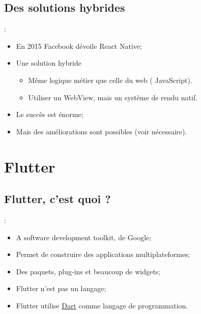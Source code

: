 \documentclass[10pt]{beamer}
\begin{document}
\subsection{Des solutions hybrides}
\begin{frame}[fragile,t]{\secname : \subsecname}
    \begin{itemize}
        \item En 2015 Facebook dévoile React Native;
        \item Une solution hybride
              \begin{itemize}
                  \item Même logique métier que celle du web ( JavaScript).
                  \item Utiliser un WebView, mais un système de rendu natif.
              \end{itemize}
        \item Le succès est énorme;
        \item Mais des améliorations sont possibles (voir nécessaire).
    \end{itemize}
\end{frame}


\section{Flutter}
\subsection{Flutter, c'est quoi ?}
\begin{frame}[fragile,t]{\secname : \subsecname}
    \begin{itemize}
        \item A software development toolkit, de Google;
        \item Permet de construire des applications multiplateformes;
        \item Des paquets, plug-ins et beaucoup de widgets;
        \item Flutter n'est pas un langage;
        \item Flutter utilise \href{https://dart.dev}{Dart} comme langage de programmation.
    \end{itemize}
\end{frame}
\end{document}
